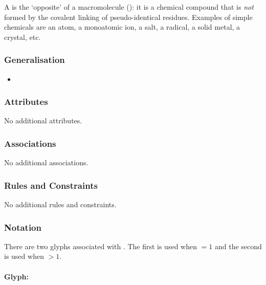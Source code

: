 A  is the `opposite' of a macromolecule
(): it is a chemical compound that is \emph{not}
formed by the covalent linking of pseudo-identical residues.  Examples
of simple chemicals are an atom, a monoatomic ion, a salt, a radical,
a solid metal, a crystal, etc.

\subsubsection{Generalisation}

\begin{itemize}
\item {}
\end{itemize}

\subsubsection{Attributes}

No additional attributes.

\subsubsection{Associations}

No additional associations.

\subsubsection{Rules and Constraints}

No additional rules and constraints.

\subsubsection{Notation}

There are two glyphs associated with . The
first  is used when  $= 1$
and the second  is used when
 $> 1$.

\paragraph{Glyph: }

